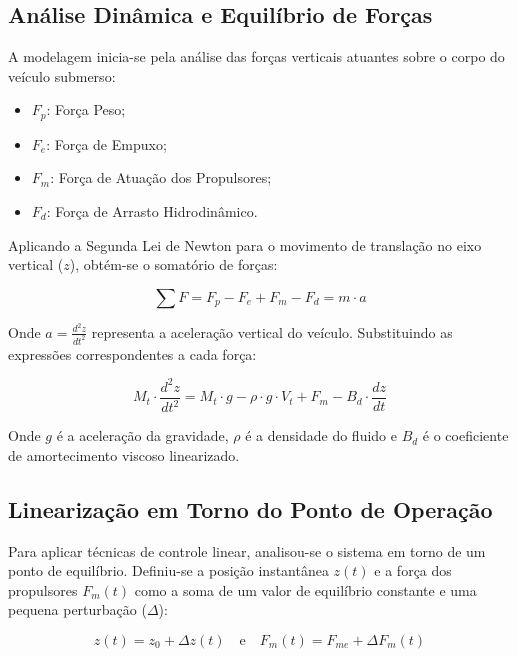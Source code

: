 \documentclass[12pt, a4paper]{article}
\begin{document}
		\subsection{Análise Dinâmica e Equilíbrio de Forças}

			A modelagem inicia-se pela análise das forças verticais atuantes sobre o corpo do veículo submerso:

			\begin{itemize}
				\item $F_{p}$: Força Peso;
				\item $F_{e}$: Força de Empuxo;
				\item $F_{m}$: Força de Atuação dos Propulsores;
				\item $F_{d}$: Força de Arrasto Hidrodinâmico.
			\end{itemize}

			Aplicando a Segunda Lei de Newton para o movimento de translação no eixo vertical ($z$), obtém-se o somatório de forças:

			\begin{equation}
				\sum F = F_{p} - F_{e} + F_{m} - F_{d} = m \cdot a
			\end{equation}

			Onde $a = \frac{d^2z}{dt^2}$ representa a aceleração vertical do veículo. Substituindo as expressões correspondentes a cada força:

			\begin{equation}
				M_t \cdot \frac{d^2z}{dt^2} = M_t \cdot g - \rho \cdot g \cdot V_t + F_{m} - B_d \cdot \frac{dz}{dt}
				\label{eq:dinamica_nao_linear}
			\end{equation}

			Onde $g$ é a aceleração da gravidade, $\rho$ é a densidade do fluido e $B_d$ é o coeficiente de amortecimento viscoso linearizado.

		\subsection{Linearização em Torno do Ponto de Operação}

			Para aplicar técnicas de controle linear, analisou-se o sistema em torno de um ponto de equilíbrio. Definiu-se a posição instantânea $z(t)$ e a força dos propulsores $F_m(t)$ como a soma de um valor de equilíbrio constante e uma pequena perturbação ($\Delta$):

			\begin{equation}
				z(t) = z_0 + \Delta z(t) \quad \text{e} \quad F_m(t) = F_{me} + \Delta F_m(t)
			\end{equation}
\end{document}
